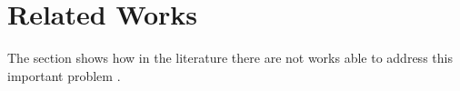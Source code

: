 \section{Related Works}
\label{sec:related}

The section shows how in the literature there are not works able to address this important problem \cite{bib:StartingPoint}.

